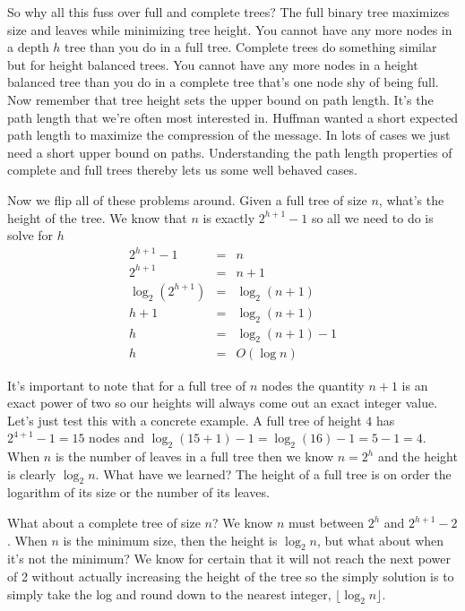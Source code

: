 \documentclass[]{tufte-handout}
\begin{document}
So why all this fuss over full and complete trees? The full binary tree maximizes size and leaves while minimizing tree height. You cannot have any more nodes in a depth $h$ tree than you do in a full tree. Complete trees do something similar but for height balanced trees. You cannot have any more nodes in a height balanced tree than you do in a complete tree that's one node shy of being full. Now remember that tree height sets the upper bound on path length.  It's the path length that we're often most interested in. Huffman wanted a short expected path length to maximize the compression of the message. In lots of cases we just need a short upper bound on paths.  Understanding the path length properties of complete and full trees thereby lets us some well behaved cases. 

Now we flip all of these problems around. Given a full tree of size $n$, what's the height of the tree. We know that $n$ is exactly $2^{h+1}-1$ so all we need to do is solve for $h$
\begin{equation*}
\begin{array}{rcl}
2^{h+1}-1 &=& n \\
2^{h+1}  &=&  n + 1 \\
\log_2(2^{h+1})  &=&  \log_2(n + 1) \\
h+1 &=& \log_2(n + 1) \\
h &=& \log_2(n + 1)-1 \\
h &=& O(\log n)   
\end{array}
\end{equation*}

It's important to note that for a full tree of $n$ nodes the quantity $n+1$ is an exact power of two so our heights will always come out an exact integer value. Let's just test this with a concrete example. A full tree of height $4$ has $2^{4+1}-1 = 15$ nodes and $\log_2(15+1)-1 = \log_2(16)-1 = 5-1 = 4$. When $n$ is the number of leaves in a full tree then we know $n = 2^h$ and the height is clearly $\log_2 n$. What have we learned? The height of a full tree is on order the logarithm of its size or the number of its leaves. 

What about a complete tree of size $n$? We know $n$ must between $2^h$ and $2^{h+1}-2$. When $n$ is the minimum size, then the height is $\log_2n$, but what about when it's not the minimum? We know for certain that it will not reach the next power of 2 without actually increasing the height of the tree so the simply solution is to simply take the log and round down to the nearest integer, $\lfloor \log_2 n \rfloor$.
\end{document}
